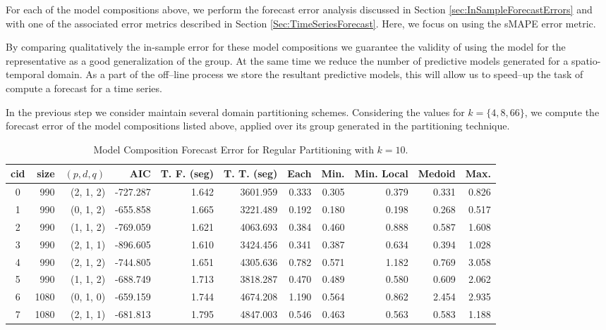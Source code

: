 For each of the model compositions above, we perform the forecast error analysis discussed in Section \ref{sec:InSampleForecastErrors} and with one of the associated error metrics described in Section \ref{Sec:TimeSeriesForecast}. Here, we focus on using the sMAPE error metric.

By comparing qualitatively the in-sample error for these model compositions we guarantee the validity of using the model for the representative as a good generalization of the group. At the same time we reduce the number of predictive models generated for a spatio-temporal domain. As a part of the off--line process we store the resultant predictive models, this will allow us to speed--up the task of compute a forecast for a time series.

In the previous step we consider maintain several domain partitioning schemes. Considering the values for $k = \{4, 8, 66\}$, we compute the forecast error of the model compositions listed above, applied over its group generated in the partitioning technique. %
\begin{table}[h]
	\centering
	\tiny
	\begin{tabular}{|c|r|r|r|r|r|r|r|r|r|r|}
		\hline
		cid & size & $(p, d, q)$ & AIC & T. F. (seg) & T. T. (seg) & Each & Min. & Min. Local & Medoid & Max. \\
		\hline
		0 &  990 & (2, 1, 2) & -727.287 & 1.642 & 3601.959 & 0.333 & 0.305 & 0.379 & 0.331 & 0.826 \\
		1 &  990 & (0, 1, 2) & -655.858 & 1.665 & 3221.489 & 0.192 & 0.180 & 0.198 & 0.268 & 0.517 \\
		2 &  990 & (1, 1, 2) & -769.059 & 1.621 & 4063.693 & 0.384 & 0.460 & 0.888 & 0.587 & 1.608 \\
		3 &  990 & (2, 1, 1) & -896.605 & 1.610 & 3424.456 & 0.341 & 0.387 & 0.634 & 0.394 & 1.028 \\
		4 &  990 & (2, 1, 2) & -744.805 & 1.651 & 4305.636 & 0.782 & 0.571 & 1.182 & 0.769 & 3.058 \\
		5 &  990 & (1, 1, 2) & -688.749 & 1.713 & 3818.287 & 0.470 & 0.489 & 0.580 & 0.609 & 2.062 \\
		6 & 1080 & (0, 1, 0) & -659.159 & 1.744 & 4674.208 & 1.190 & 0.564 & 0.862 & 2.454 & 2.935 \\
		7 & 1080 & (2, 1, 1) & -681.813 & 1.795 & 4847.003 & 0.546 & 0.463 & 0.563 & 0.583 & 1.188 \\ \hline
	\end{tabular}
	\caption{Model Composition Forecast Error for Regular Partitioning with $k=10$.}
	\label{Table:ForecastErrorRegulark10}
\end{table}

